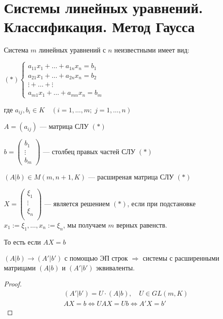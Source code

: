 
\section{Системы линейных уравнений. Классификация. Метод Гаусса}

\begin{conj}
    
    Система $m$ линейных уравнений с $n$ неизвестными имеет вид:

    $(*)\begin{cases}
        a_{11}x_1 + \dots + a_{1n}x_n = b_1 \\
        a_{21}x_1 + \dots + a_{2n}x_n = b_2 \\
        \vdots + \dots + \vdots \\
        a_{m1}x_1 + \dots + a_{mn}x_n = b_m
    \end{cases}$

    где $a_{ij}, b_i \in K \quad (i = 1, \dots, m; \; j = 1, \dots, n)$

    $A = (a_{ij})$ --- матрица СЛУ $(*)$

    $b =
    \begin{pmatrix}
        b_1 \\
        \vdots \\
        b_m    
    \end{pmatrix}$ --- столбец правых частей СЛУ $(*)$

    $(A | b) \in M(m, n + 1, K)$ --- расширеная матрица СЛУ $(*)$

\end{conj}

\begin{conj}
    $X = 
    \begin{pmatrix}
        \xi_1 \\
        \vdots \\
        \xi_n \\
    \end{pmatrix}$ --- является решением $(*)$,
    если при подстановке $x_1:=\xi_1, \dots, x_n:=\xi_n$, 
    мы получаем $m$ верных равенств.

    То есть если $AX = b$
\end{conj}

\begin{theorem-non}
    $(A|b) \rightarrow (A'|b')$ с помощью ЭП строк
    $\Longrightarrow$ системы с расширенными
    матрицами $(A|b)$ и $(A'|b')$ эквиваленты.

    \begin{proof}
        \begin{gather*}
            (A'|b') = U \cdot (A | b), \quad U \in GL(m, K) \\
            AX = b \Longleftrightarrow UAX = Ub \Longleftrightarrow A'X = b'      
        \end{gather*}
    \end{proof}

\end{theorem-non}

